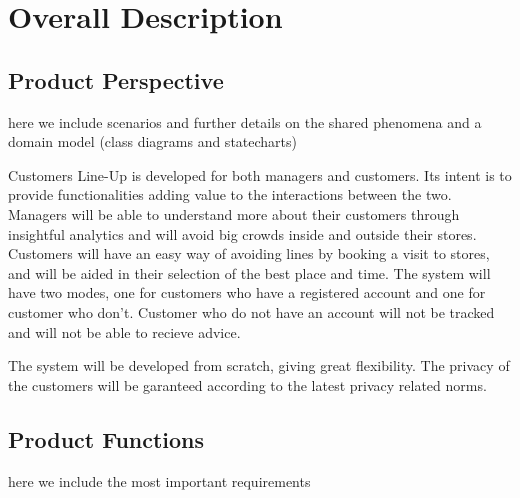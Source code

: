\section{Overall Description}\label{sec:overall_desc}

\subsection{Product Perspective}

here we include scenarios and further details on the shared
phenomena and a domain model (class diagrams and statecharts)

Customers Line-Up is developed for both managers and customers.
Its intent is to provide functionalities adding value to the interactions between the two.
Managers will be able to understand more about their customers through insightful analytics and will avoid big crowds inside and outside their stores.
Customers will have an easy way of avoiding lines by booking a visit to stores, and will be aided in their selection of the best place and time.
The system will have two modes, one for customers who have a registered account and one for customer who don't.
Customer who do not have an account will not be tracked and will not be able to recieve advice.

The system will be developed from scratch, giving great flexibility.
The privacy of the customers will be garanteed according to the latest privacy related norms.
\subsection{Product Functions}
here we include the most important requirements

